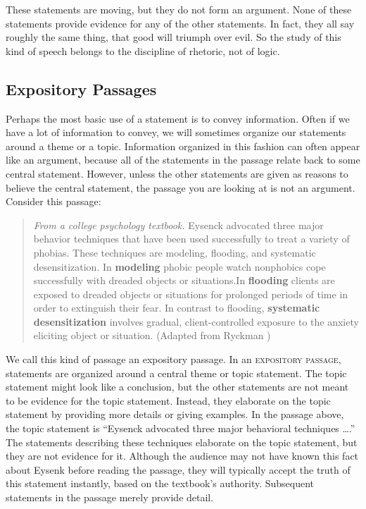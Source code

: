 These statements are moving, but they do not form an argument. None of these statements provide evidence for any of the other statements. In fact, they all say roughly the same thing, that good will triumph over evil. So the study of this kind of speech belongs to the discipline of rhetoric, not of logic.

\subsection{Expository Passages}

Perhaps the most basic use of a statement is to convey information. Often if we have a lot of information to convey, we will sometimes organize our statements around a theme or a topic. Information organized in this fashion can often appear like an argument, because all of the statements in the passage relate back to some central statement. However, unless the other statements are given as reasons to believe the central statement, the passage you are looking at is not an argument. Consider this passage:

\begin{quotation}\noindent\textit{From a college psychology textbook.} Eysenck advocated three major behavior techniques that have been used successfully to treat a variety of phobias. These techniques are modeling, flooding, and systematic desensitization. In \textbf{modeling} phobic people watch nonphobics cope successfully with dreaded objects or situations.In \textbf{flooding} clients are exposed to dreaded objects or situations for prolonged periods of time in order to extinguish their fear. In contrast to flooding, \textbf{systematic desensitization} involves gradual, client-controlled exposure to the anxiety eliciting object or situation. (Adapted from Ryckman \cite{Ryckman2007}) \end{quotation}

We call this kind of passage an expository passage. In an \textsc{\gls{expository passage}}, \label{def:expository_passage} statements are organized around a central theme or topic statement. The topic statement might look like a conclusion, but the other statements are not meant to be evidence for the topic statement. Instead, they elaborate on the topic statement by providing more details or giving examples. In the passage above, the topic statement is ``Eysenck advocated three major behavioral techniques \ldots.'' The statements describing these techniques elaborate on the topic statement, but they are not evidence for it. Although the audience may not have known this fact about Eysenk before reading the passage, they will typically accept the truth of this statement instantly, based on the textbook's authority. Subsequent statements in the passage merely provide detail.

